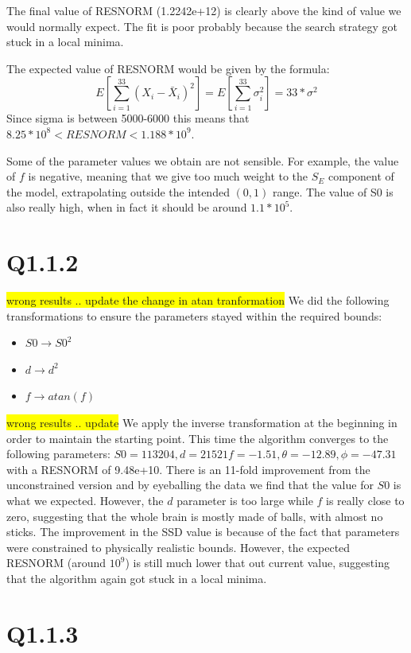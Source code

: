 \documentclass[11pt,a4paper,oneside]{report}
\newcommand{\hilight}[1]{\colorbox{yellow}{#1}}
\begin{document}

The final value of RESNORM (1.2242e+12) is clearly above the kind of value we would normally expect. The fit is poor probably because the search strategy got stuck in a local minima.

 

The expected value of RESNORM would be given by the formula:
$$E\left[\sum_{i=1}^{33} (X_i - \bar{X}_i)^2\right] = E\left[\sum_{i=1}^{33} \sigma_i^2\right] = 33 * \sigma^2 $$
Since sigma is between 5000-6000 this means that $ 8.25*10^8 < RESNORM < 1.188 * 10^9$.


Some of the parameter values we obtain are not sensible. For example, the value of $f$ is negative, meaning that we give too much weight to the $S_E$ component of the model, extrapolating outside the intended $(0,1)$ range. The value of S0 is also really high, when in fact it should be around $1.1 * 10^5$. 


\section*{Q1.1.2}


\hilight{wrong results .. update the change in atan tranformation}
We did the following transformations to ensure the parameters stayed within the required bounds:
\begin{itemize}
 \item $S0 \to S0^2$
 \item $d \to d^2$
 \item $f \to atan(f)$
\end{itemize}
\hilight{wrong results .. update}
We apply the inverse transformation at the beginning in order to maintain the starting point. This time the algorithm converges to the following parameters: $S0 = 113204, d=21521 f=-1.51, \theta=-12.89,  \phi=-47.31$ with a RESNORM of 9.48e+10. There is an 11-fold improvement from the unconstrained version and by eyeballing the data we find that the value for $S0$ is what we expected. However, the $d$ parameter is too large while $f$ is really close to zero, suggesting that the whole brain is mostly made of balls, with almost no sticks. The improvement in the SSD value is because of the fact that parameters were constrained to physically realistic bounds. However, the expected RESNORM (around $10^9$) is still much lower that out current value, suggesting that the algorithm again got stuck in a local minima.

\section*{Q1.1.3}
\end{document}
